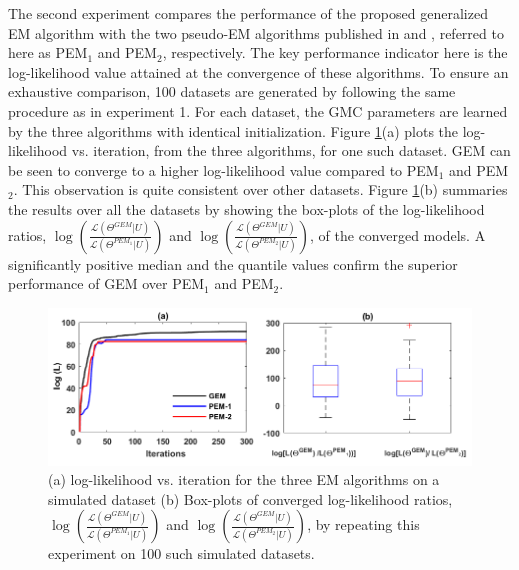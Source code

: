 \documentclass{article}
\theoremstyle{plain}
\theoremstyle{definition}
\theoremstyle{remark}
\begin{document}
The second experiment compares the performance of the proposed generalized EM algorithm with the two pseudo-EM algorithms published in \citet{Bhattacharya2014} and \citet{Tewari2011}, referred to here as PEM$_1$ and PEM$_2$, respectively. The key performance indicator here is the log-likelihood value attained at the convergence of these algorithms. To ensure an exhaustive comparison, 100 datasets are generated by following the same procedure as in experiment 1. For each dataset, the GMC parameters are learned by the three algorithms with identical initialization. Figure \ref{fig:EM_algo_comp}(a) plots the log-likelihood vs. iteration, from the three algorithms, for one such dataset. GEM can be seen to converge to a higher log-likelihood value compared to PEM$_1$ and PEM$_2$. This observation is quite consistent over other datasets. Figure \ref{fig:EM_algo_comp}(b) summaries the results over all the datasets by showing the box-plots of the log-likelihood ratios, $\log\left( \frac{\mathcal{L}\left(\Theta^{GEM}|U\right)}{\mathcal{L}\left(\Theta^{PEM_1}|U\right)}\right)$ and $\log\left( \frac{\mathcal{L}\left(\Theta^{GEM}|U\right)}{\mathcal{L}\left(\Theta^{PEM_2}|U\right)}\right)$, of the converged models. A significantly positive median and the quantile values confirm the superior performance of GEM over PEM$_1$ and PEM$_2$.
\begin{figure}[ht]
\vskip 0.2in
\begin{center}
\centerline{\includegraphics[width=\columnwidth,keepaspectratio=true]{figures/EM_algo_comparisons}}
\caption{(a) log-likelihood vs. iteration for the three EM algorithms on a simulated dataset (b) Box-plots of converged log-likelihood ratios,  $\log\left( \frac{\mathcal{L}\left(\Theta^{GEM}|U\right)}{\mathcal{L}\left(\Theta^{PEM_1}|U\right)}\right)$ and $\log\left( \frac{\mathcal{L}\left(\Theta^{GEM}|U\right)}{\mathcal{L}\left(\Theta^{PEM_2}|U\right)}\right)$, by repeating this experiment on 100 such simulated datasets.}
\label{fig:EM_algo_comp}
\end{center}
\vskip -0.2in
\end{figure}  
\end{document}
